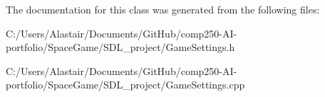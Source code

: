 The documentation for this class was generated from the following files\+:\begin{DoxyCompactItemize}
\item 
C\+:/\+Users/\+Alastair/\+Documents/\+Git\+Hub/comp250-\/\+A\+I-\/portfolio/\+Space\+Game/\+S\+D\+L\+\_\+project/Game\+Settings.\+h\item 
C\+:/\+Users/\+Alastair/\+Documents/\+Git\+Hub/comp250-\/\+A\+I-\/portfolio/\+Space\+Game/\+S\+D\+L\+\_\+project/Game\+Settings.\+cpp\end{DoxyCompactItemize}
